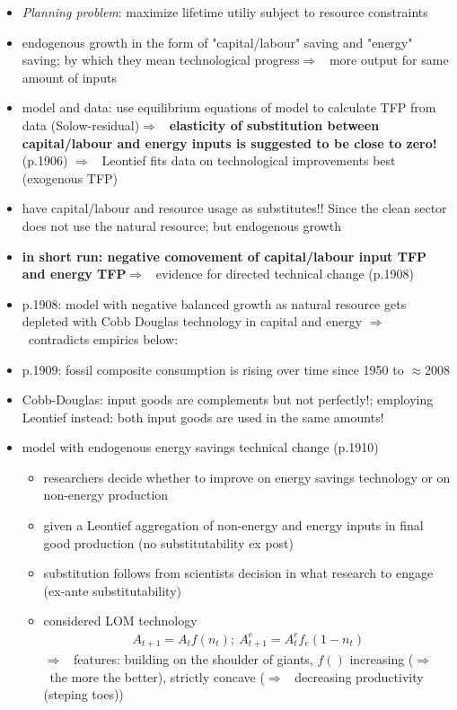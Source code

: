 \documentclass[12pt]{article}
\newcommand{\ar}{$\Rightarrow$ \ }
\begin{document}
\begin{itemize}
	 	\item \textit{Planning problem}: maximize lifetime utiliy subject to resource constraints
	 	\item endogenous growth in the form of "capital/labour" saving and "energy" saving; by which they mean technological progress\ar more output for same amount of inputs
	 	\item model and data: use equilibrium equations of model to calculate TFP from data (Solow-residual)\ar \textbf{elasticity of substitution between capital/labour and energy inputs is suggested to be close to zero!} (p.1906) \ar Leontief fits data on technological improvements best (exogenous TFP)
	 	\item \cite{Acemoglu2012TheChange} have capital/labour and resource usage as substitutes!! Since the clean sector does not use the natural resource; but endogenous growth
	 	\item \textbf{in short run: negative comovement of capital/labour input TFP and energy TFP}\ar evidence for directed technical change (p.1908) 
	 	\item p.1908: model with negative balanced growth as natural resource gets depleted with Cobb Douglas technology in capital and energy \ar contradicts empirics below:
	 	\item p.1909: fossil composite consumption is rising over time since 1950 to $\approx$2008
	 	\item Cobb-Douglas: input goods are complements but not perfectly!; employing Leontief instead: both input goods are used in the same amounts!
	 	\item model with endogenous energy savings technical change (p.1910)
	 	\begin{itemize}
\item researchers decide whether to improve on energy savings technology or on non-energy production
\item given a Leontief aggregation of non-energy and energy inputs in final good production (no substitutability ex post)
\item substitution follows from scientists decision in what research to engage (ex-ante substitutability)
\item considered LOM technology
\begin{align}
A_{t+1}=A_tf(n_t); \ A_{t+1}^e=A_t^ef_e(1-n_t)
\end{align}
\ar features: building on the shoulder of giants, $f()$ increasing (\ar the more the better), strictly concave (\ar decreasing productivity (steping toes))

\end{itemize}
\end{itemize}
\end{document}
